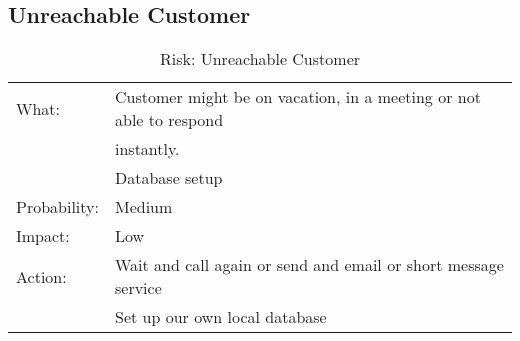 \subsection{Unreachable Customer}
\begin{table}[H]
\begin{tabular}{| l | l |}
	\hline
	What: & Customer might be on vacation, in a meeting or not able to respond\\
	& instantly.\\
	& Database setup\\ %
	\hline
	Probability: & Medium \\
	\hline
	Impact: & Low \\
	\hline
	Action: & Wait and call again or send and email or short message service\\
	& Set up our own local database\\
	\hline
\end{tabular}
\caption{Risk: Unreachable Customer}
\end{table}
